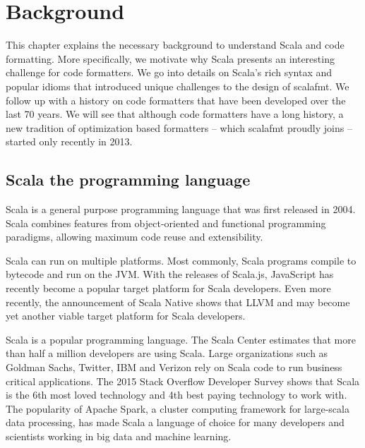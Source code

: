 \newcommand{\naive}{na\"{\i}ve}
\newcommand{\dartfmt}{\texttt{dartfmt}}
\newcommand{\gofmt}{\texttt{gofmt}}
\newcommand{\rfmt}{\texttt{rfmt}}
\section{Background}
This chapter explains the necessary background to understand Scala and code formatting.
More specifically, we motivate why Scala presents an interesting challenge for code formatters.
We go into details on Scala's rich syntax and popular idioms that introduced unique challenges to the design of scalafmt.
We follow up with a history on code formatters that have been developed over the last 70 years.
We will see that although code formatters have a long history, a new tradition of optimization based formatters -- which scalafmt proudly joins -- started only recently in 2013.

\subsection{Scala the programming language}\label{sec:scala}
Scala\autocite{odersky_scala_2004} is a general purpose programming language that was first released in 2004.
Scala combines features from object-oriented and functional programming paradigms, allowing maximum code reuse and extensibility.

Scala can run on multiple platforms.
Most commonly, Scala programs compile to bytecode and run on the JVM.
With the releases of Scala.js\autocite{doeraene_scala.js_2015}, JavaScript has recently become a popular target platform for Scala developers.
Even more recently, the announcement of Scala Native\autocite{_scala-native/scala-native_????} shows that LLVM and may become yet another viable target platform for Scala developers.

Scala is a popular programming language.
The Scala Center estimates that more than half a million developers are using Scala\autocite{odersky_scala_2016}.
Large organizations such as Goldman Sachs, Twitter, IBM and Verizon rely on Scala code to run business critical applications.
The 2015 Stack Overflow Developer Survey shows that Scala is the 6th most loved technology and 4th best paying technology to work with\autocite{_stack_????}.
The popularity of Apache Spark\autocite{_apache_????-1}, a cluster computing framework for large-scala data processing, has made Scala a language of choice for many developers and scientists working in big data and machine learning.

